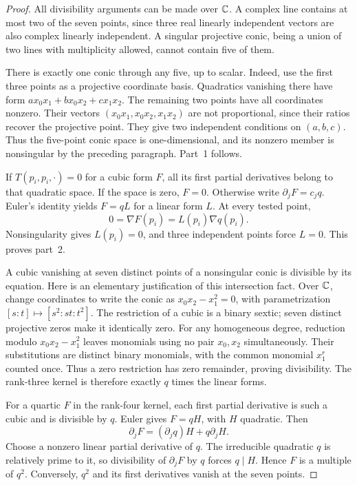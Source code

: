 \begin{proof}
All divisibility arguments can be made over \(\mathbb C\).
A complex line contains at most two of the seven points, since
three real linearly independent vectors are also complex linearly
independent. A singular projective conic, being a union of two
lines with multiplicity allowed, cannot contain five of them.

There is exactly one conic through any five, up to scalar.
Indeed, use the first three points as a projective coordinate
basis. Quadratics vanishing there have form
\(a x_0x_1+b x_0x_2+c x_1x_2\).
The remaining two points have all coordinates nonzero.
Their vectors \((x_0x_1,x_0x_2,x_1x_2)\) are not proportional,
since their ratios recover the projective point.
They give two independent conditions on \((a,b,c)\).
Thus the five-point conic space is one-dimensional, and its
nonzero member is nonsingular by the preceding paragraph.
Part~1 follows.

If \(T(p_i,p_i,\cdot)=0\) for a cubic form \(F\), all its
first partial derivatives belong to that quadratic space.
If the space is zero, \(F=0\). Otherwise write
\(\partial_jF=c_jq\). Euler's identity yields \(F=qL\)
for a linear form \(L\). At every tested point,
\[
 0=\nabla F(p_i)=L(p_i)\nabla q(p_i).
\]
Nonsingularity gives \(L(p_i)=0\), and three independent points
force \(L=0\). This proves part~2.

A cubic vanishing at seven distinct points of a nonsingular
conic is divisible by its equation. Here is an elementary
justification of this intersection fact. Over \(\mathbb C\), change
coordinates to write the conic as \(x_0x_2-x_1^2=0\), with
parametrization
\([s:t]\mapsto[s^2:st:t^2]\).
The restriction of a cubic is a binary sextic; seven distinct
projective zeros make it identically zero.
For any homogeneous degree, reduction modulo \(x_0x_2-x_1^2\)
leaves monomials using no pair \(x_0,x_2\) simultaneously.
Their substitutions are distinct binary monomials, with the
common monomial \(x_1^r\) counted once. Thus a zero restriction
has zero remainder, proving divisibility.
The rank-three kernel is therefore exactly \(q\) times the
linear forms.

For a quartic \(F\) in the rank-four kernel, each first partial
derivative is such a cubic and is divisible by \(q\).
Euler gives \(F=qH\), with \(H\) quadratic. Then
\[
 \partial_jF=(\partial_jq)H+q\partial_jH.
\]
Choose a nonzero linear partial derivative of \(q\).
The irreducible quadratic \(q\) is relatively prime to it,
so divisibility of \(\partial_jF\) by \(q\) forces \(q\mid H\).
Hence \(F\) is a multiple of \(q^2\).
Conversely, \(q^2\) and its first derivatives vanish at the
seven points.


\end{proof}
